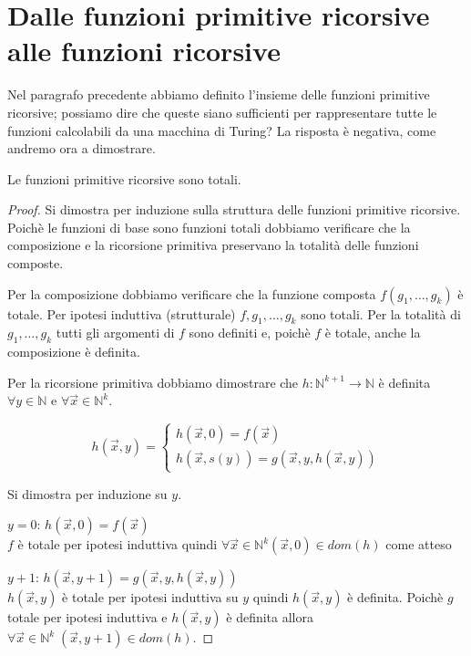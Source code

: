 \section{Dalle funzioni primitive ricorsive alle funzioni ricorsive}

Nel paragrafo precedente abbiamo definito l'insieme delle funzioni
primitive ricorsive; possiamo dire che queste siano sufficienti per
rappresentare tutte le funzioni calcolabili da una macchina di Turing?
La risposta è negativa, come andremo ora a dimostrare.

\begin{prop}\label{PRsonoTotali}
Le funzioni primitive ricorsive sono totali.
\end{prop}
\begin{proof}
Si dimostra per induzione sulla struttura delle funzioni primitive
ricorsive.  Poichè le funzioni di base sono funzioni totali dobbiamo
verificare che la composizione e la ricorsione primitiva preservano la
totalità delle funzioni composte.

Per la composizione dobbiamo verificare che la funzione composta
$f(g_1, \dots, g_k)$ è totale. Per ipotesi induttiva
(strutturale) $f,g_1,\dots,g_k$ sono totali. Per la totalità di
$g_1,\dots,g_k$ tutti gli argomenti di $f$ sono definiti e, poichè $f$
è totale, anche la composizione è definita.

Per la ricorsione primitiva dobbiamo dimostrare che
$h:\mathbb{N}^{k+1} \to \mathbb{N}$ è definita $\forall y \in
\mathbb{N}$ e $\forall \vec{x} \in \mathbb{N}^k$.

$$h(\vec{x},y)=\left\{
\begin{array}{ll} h(\vec{x}, 0) = f(\vec{x})\\
                  h(\vec{x}, s(y)) = g(\vec{x},y,h(\vec{x},y))
\end{array} \right.$$

Si dimostra per induzione su $y$.

$y = 0$: $h(\vec{x}, 0) = f(\vec{x})$\\ $f$ è totale per ipotesi
induttiva quindi $\forall \vec{x} \in \mathbb{N}^k (\vec{x}, 0) \in
dom(h)$ come atteso

$y + 1$: $h(\vec{x}, y + 1) = g(\vec{x}, y, h(\vec{x}, y))$\\
$h(\vec{x}, y)$ è totale per ipotesi induttiva su $y$ quindi
$h(\vec{x}, y)$ è definita. Poichè $g$ totale per ipotesi induttiva e
$h(\vec{x}, y)$ è definita allora $\forall \vec{x} \in \mathbb{N}^k \;
(\vec{x}, y + 1) \in dom(h)$.
\end{proof}

